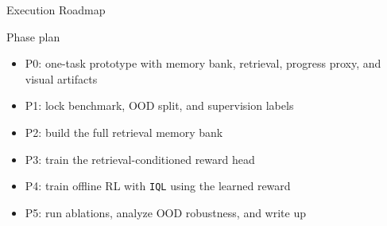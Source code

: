 \documentclass[aspectratio=169,11pt]{beamer}
\begin{document}
\begin{frame}[t]{Execution Roadmap}
\small
\begin{block}{Phase plan}
  \begin{itemize}
    \item P0: one-task prototype with memory bank, retrieval, progress proxy, and visual artifacts
    \item P1: lock benchmark, OOD split, and supervision labels
    \item P2: build the full retrieval memory bank
    \item P3: train the retrieval-conditioned reward head
    \item P4: train offline RL with \texttt{IQL} using the learned reward
    \item P5: run ablations, analyze OOD robustness, and write up
  \end{itemize}
\end{block}
\end{frame}
\end{document}
